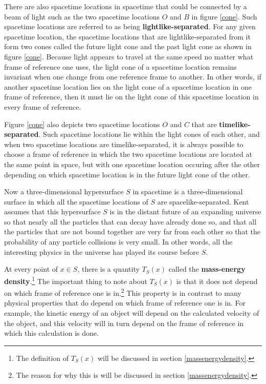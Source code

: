 There are also spacetime locations in spacetime that could be connected by a beam of light such as the two spacetime locations $O$ and $B$ in figure \ref{cone}. Such spacetime locations are referred to as being \textbf{lightlike-separated}. For any given spacetime location, the spacetime locations that are lightlike-separated from it form two cones called the future light cone and the past light cone as shown in figure \ref{cone}. Because light appears to travel at the same speed no matter what frame of reference one uses, the light cone of a spacetime location remains invariant when one change from one reference frame to another. In other words, if another spacetime location lies on the light cone of a spacetime location in one frame of reference, then it must lie on the light cone of this spacetime location in every frame of reference. 

Figure \ref{cone} also depicts two spacetime locations $O$ and $C$ that are \textbf{timelike-separated}. Such spacetime locations lie within the light cones of each other, and when two spacetime locations are timelike-separated, it is always possible to choose a frame of reference in which the two spacetime locations are located at the same point in space, but with one spacetime location occuring after the other  depending on which spacetime location is in  the future light cone of the other. 

Now a three-dimensional hypersurface $S$ in spacetime is a three-dimensional surface in which all the spacetime locations of $S$ are spacelike-separated. Kent assumes that this hypersurface $S$ is in the distant future of an expanding universe so that nearly all the particles that can decay have already done so, and that all the particles that are not bound together are very far from each other so that the probability of any particle collisions is very small. In other words, all the interesting physics in the universe has played its course before $S$.

At every point of $x\in S$, there is a quantity $T_S(x)$ called the \label{massenergydensity}\textbf{mass-energy density}.\footnote{The definition of $T_S(x)$ will be discussed in section \ref{massenergydensity}.} The important thing to note about $T_S(x)$ is that it does not depend on which frame of reference one is in.\footnote{The reason for why this is will be discussed in section \ref{massenergydensity}.}
  This property is in contrast to many physical properties that do depend on which frame of reference one is in. For example, the kinetic energy of an object will depend on the calculated velocity of the object, and this velocity will in turn depend on the frame of reference in which this calculation is done. 
  
